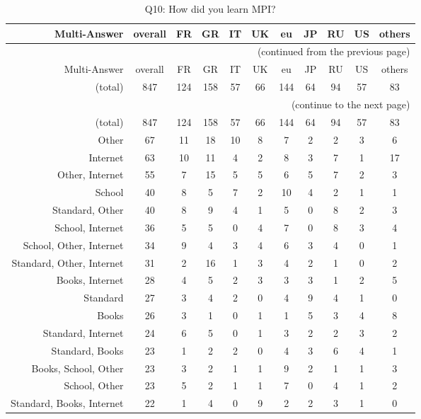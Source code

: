 \clearpage%
{\footnotesize\begin{landscape}%
\begin{longtable}[htb]{r|c|c|c|c|c|c|c|c|c|c}%
\caption{Q10: How did you learn MPI?}%
\label{tab:Q10-mans} \\%
\hline%
Multi-Answer & overall & FR & GR & IT & UK & eu & JP & RU & US & others \\
 \hline%
\endfirsthead%
\multicolumn{11}{r}{(continued from the previous page)}\\%
\hline%
Multi-Answer & overall & FR & GR & IT & UK & eu & JP & RU & US & others \\
 \hline%
\endhead%
\hline%
(total) & 847 & 124 & 158 & 57 & 66 & 144 & 64 & 94 & 57 & 83 \\%
\hline%
\multicolumn{11}{r}{(continue to the next page)}\\%
\endfoot%
\hline%
(total) & 847 & 124 & 158 & 57 & 66 & 144 & 64 & 94 & 57 & 83 \\%
\hline%
\endlastfoot%
\hline%
{Other} & 67 & 11 & 18 & 10 & 8 & 7 & 2 & 2 & 3 & 6 \\%
{Internet} & 63 & 10 & 11 & 4 & 2 & 8 & 3 & 7 & 1 & 17 \\%
{Other, Internet} & 55 & 7 & 15 & 5 & 5 & 6 & 5 & 7 & 2 & 3 \\%
{School} & 40 & 8 & 5 & 7 & 2 & 10 & 4 & 2 & 1 & 1 \\%
{Standard, Other} & 40 & 8 & 9 & 4 & 1 & 5 & 0 & 8 & 2 & 3 \\%
{School, Internet} & 36 & 5 & 5 & 0 & 4 & 7 & 0 & 8 & 3 & 4 \\%
{School, Other, Internet} & 34 & 9 & 4 & 3 & 4 & 6 & 3 & 4 & 0 & 1 \\%
{Standard, Other, Internet} & 31 & 2 & 16 & 1 & 3 & 4 & 2 & 1 & 0 & 2 \\%
{Books, Internet} & 28 & 4 & 5 & 2 & 3 & 3 & 3 & 1 & 2 & 5 \\%
{Standard} & 27 & 3 & 4 & 2 & 0 & 4 & 9 & 4 & 1 & 0 \\%
{Books} & 26 & 3 & 1 & 0 & 1 & 1 & 5 & 3 & 4 & 8 \\%
{Standard, Internet} & 24 & 6 & 5 & 0 & 1 & 3 & 2 & 2 & 3 & 2 \\%
{Standard, Books} & 23 & 1 & 2 & 2 & 0 & 4 & 3 & 6 & 4 & 1 \\%
{Books, School, Other} & 23 & 3 & 2 & 1 & 1 & 9 & 2 & 1 & 1 & 3 \\%
{School, Other} & 23 & 5 & 2 & 1 & 1 & 7 & 0 & 4 & 1 & 2 \\%
{Standard, Books, Internet} & 22 & 1 & 4 & 0 & 9 & 2 & 2 & 3 & 1 & 0 \\%

\end{longtable}
\end{landscape}}
